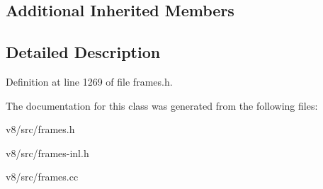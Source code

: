 \subsection*{Additional Inherited Members}


\subsection{Detailed Description}


Definition at line 1269 of file frames.\+h.



The documentation for this class was generated from the following files\+:\begin{DoxyCompactItemize}
\item 
v8/src/frames.\+h\item 
v8/src/frames-\/inl.\+h\item 
v8/src/frames.\+cc\end{DoxyCompactItemize}
